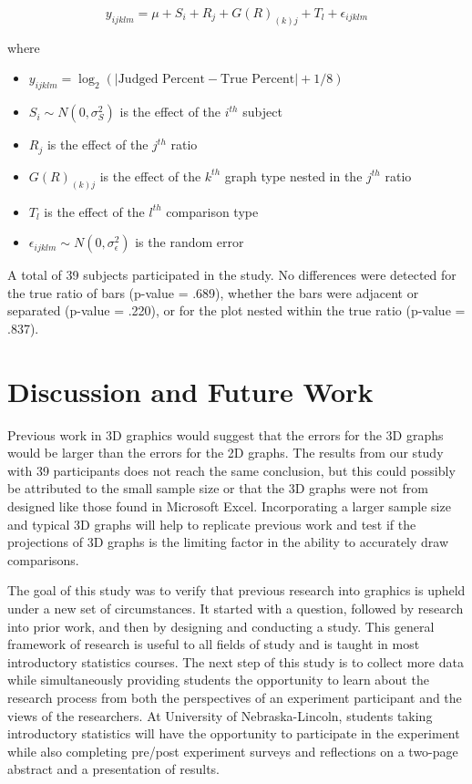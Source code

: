 \documentclass[letterpaper,inpress]{jdsart}
\begin{document}
\[y_{ijklm}=\mu+S_i+R_j+G(R)_{(k)j}+T_l+\epsilon_{ijklm}\]

\noindent where

\begin{itemize}
\item
  \(y_{ijklm}=\log_2(|\text{Judged Percent} - \text{True Percent}|+1/8)\)
\item
  \(S_i\sim N(0,\sigma^2_S)\) is the effect of the \(i^{th}\) subject
\item
  \(R_j\) is the effect of the \(j^{th}\) ratio
\item
  \(G(R)_{(k)j}\) is the effect of the \(k^{th}\) graph type nested in the \(j^{th}\) ratio
\item
  \(T_l\) is the effect of the \(l^{th}\) comparison type
\item
  \(\epsilon_{ijklm}\sim N(0,\sigma^2_\epsilon)\) is the random error
\end{itemize}

A total of 39 subjects participated in the study. No differences were detected for the true ratio of bars (p-value = .689), whether the bars were adjacent or separated (p-value = .220), or for the plot nested within the true ratio (p-value = .837).

\hypertarget{discussion-and-future-work}{%
\section{Discussion and Future Work}\label{discussion-and-future-work}}

Previous work in 3D graphics would suggest that the errors for the 3D graphs would be larger than the errors for the 2D graphs. The results from our study with 39 participants does not reach the same conclusion, but this could possibly be attributed to the small sample size or that the 3D graphs were not from designed like those found in Microsoft Excel. Incorporating a larger sample size and typical 3D graphs will help to replicate previous work and test if the projections of 3D graphs is the limiting factor in the ability to accurately draw comparisons.

The goal of this study was to verify that previous research into graphics is upheld under a new set of circumstances. It started with a question, followed by research into prior work, and then by designing and conducting a study. This general framework of research is useful to all fields of study and is taught in most introductory statistics courses. The next step of this study is to collect more data while simultaneously providing students the opportunity to learn about the research process from both the perspectives of an experiment participant and the views of the researchers. At University of Nebraska-Lincoln, students taking introductory statistics will have the opportunity to participate in the experiment while also completing pre/post experiment surveys and reflections on a two-page abstract and a presentation of results.
\end{document}
